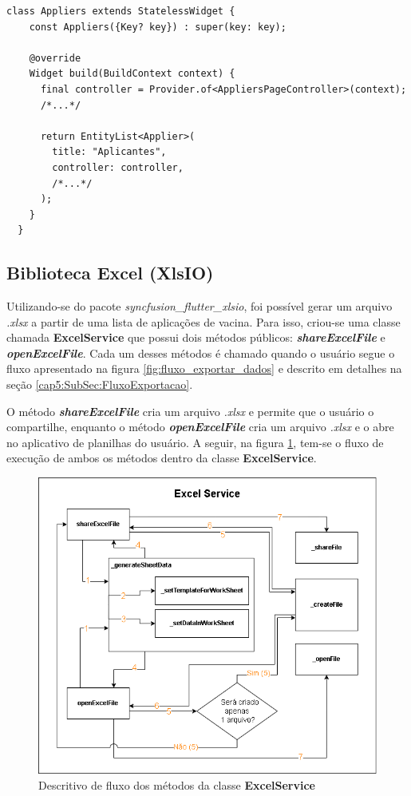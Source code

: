 \begin{lstlisting}[caption={Uso do \textit{Provider} no \textit{widget} \textbf{Appliers}}, label={lst:appliers_page_provider}]
  class Appliers extends StatelessWidget {
    const Appliers({Key? key}) : super(key: key);

    @override
    Widget build(BuildContext context) {
      final controller = Provider.of<AppliersPageController>(context);
      /*...*/

      return EntityList<Applier>(
        title: "Aplicantes",
        controller: controller,
        /*...*/
      );
    }
  }
\end{lstlisting}

\subsection{Biblioteca Excel (XlsIO)}
\label{cap4:Subsec:syncfusion_flutter_xlsio}
Utilizando-se do pacote \textit{syncfusion\_flutter\_xlsio}, foi possível gerar um arquivo \textit{.xlsx} a partir de uma lista de aplicações de vacina. Para isso, criou-se uma classe chamada \textbf{ExcelService} que possui dois métodos públicos: \textbf{\textit{shareExcelFile}} e \textbf{\textit{openExcelFile}}. Cada um desses métodos é chamado quando o usuário segue o fluxo apresentado na figura \ref{fig:fluxo_exportar_dados} e descrito em detalhes na seção \ref{cap5:SubSec:FluxoExportacao}.

O método \textbf{\textit{shareExcelFile}} cria um arquivo \textit{.xlsx} e permite que o usuário o compartilhe, enquanto o método \textbf{\textit{openExcelFile}} cria um arquivo \textit{.xlsx} e o abre no aplicativo de planilhas do usuário. A seguir, na figura \ref{fig:excel_service_diagram}, tem-se o fluxo de execução de ambos os métodos dentro da classe \textbf{ExcelService}.

\begin{figure}[!ht]
  \centering
  \includegraphics[width=\textwidth]{figuras/cap4/4_3_4_excel_service_diagram.png}
  \caption{Descritivo de fluxo dos métodos da classe \textbf{ExcelService}}
  \label{fig:excel_service_diagram}
\end{figure}

